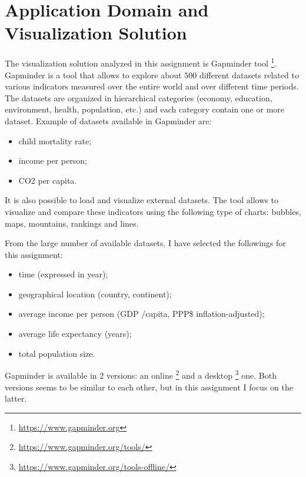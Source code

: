\section{Application Domain and Visualization Solution}
\label{sec:visualization_solution}

The visualization solution analyzed in this assignment is Gapminder tool \footnote{\url{https://www.gapminder.org}}.
Gapminder is a tool that allows to explore about $500$ different datasets related to various indicators measured over the entire world and over different time periods.
The datasets are organized in hierarchical categories (economy, education, environment, health, population, etc.) and each category contain one or more dataset.
Example of datasets available in Gapminder are:
\begin{itemize}
    \item child mortality rate;
    \item income per person;
    \item CO2 per capita.
\end{itemize}
It is also possible to load and visualize external datasets.
The tool allows to visualize and compare these indicators using the following type of charts:
bubbles, maps, mountains, rankings and lines.

From the large number of available datasets, I have selected the followings for this assignment:
\begin{itemize}
    \item time (expressed in year);
    \item geographical location (country, continent);
    \item average income per person (GDP /capita, PPP\$ inflation-adjusted);
    \item average life expectancy (years);
    \item total population size.
\end{itemize}

Gapminder is available in $2$ versions: an online \footnote{\url{https://www.gapminder.org/tools/}} and a desktop \footnote{\url{https://www.gapminder.org/tools-offline/}} one.
Both versions seems to be similar to each other, but in this assignment I focus on the latter.
